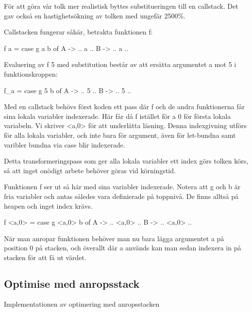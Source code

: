 \documentclass[Rapport]{subfiles}
\begin{document}
För att göra vår tolk mer realistisk byttes substitueringen till en callstack. 
Det gav också en hastighetsökning av tolken med ungefär 2500\%.


Callstacken fungerar såhär, betrakta funktionen f:

\begin{codeEx}
f a = case g a b of
    A -> .. a ..
    B -> .. a ..
\end{codeEx}

Evaluering av f 5 med substitution består av att
ersätta argumentet a mot 5 i funktionskroppen:

\begin{codeEx}
f_a = case g 5 b of
    A -> .. 5 ..
    B -> .. 5 ..
\end{codeEx}

Med en callstack behövs först koden ett pass där f och de andra funktionerna får sina 
lokala variabler indexerade. Här får då f istället för a 0 för första lokala variabeln.
Vi skriver <a,0> för att underlätta läsning. Denna indexgivning utförs för alla lokala 
variabler, och inte bara för argument, även för let-bundna samt varibler bundna via 
case blir indexerade.

Detta transformeringspass som ger alla lokala variabler ett index görs tolken körs,
så att inget onödigt arbete behöver göras vid körningstid.

Funktionen f ser ut så här med sina variabler indexerade. Notera att g och b är fria
variabler och antas således vara definierade på toppnivå. De finns alltså på heapen 
och inget index krävs.

\begin{codeEx}
f <a,0> = case g <a,0> b of
    A -> .. <a,0> ..
    B -> .. <a,0> ..
\end{codeEx}

När man anropar funktionen behöver man nu bara lägga argumentet a på position 0 på
stacken, och överallt där a används kan man sedan indexera in på stacken för att
få ut värdet.

\subsection{Optimise med anropsstack}

Implementationen av optimering med anropsstacken 

\end{document}
